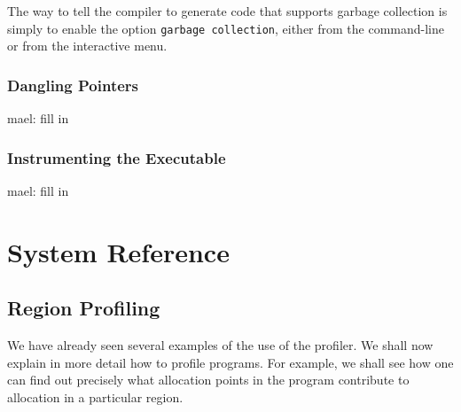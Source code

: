 \documentclass[12pt]{book}
\begin{document}
The way to tell the compiler to generate code that supports garbage
collection is simply to enable the option {\tt garbage collection},
either from the command-line or from the interactive menu.

\section{Dangling Pointers}
mael: fill in
\section{Instrumenting the Executable}
mael: fill in


\part{System Reference}

\chapter{Region Profiling}
\label{useOfProf.sec}
We have already seen several examples of the use of the profiler. We
shall now explain in more detail how to profile programs. For example, we shall see
how one can find out precisely what allocation points in the program
contribute to allocation in a particular region.
\end{document}
